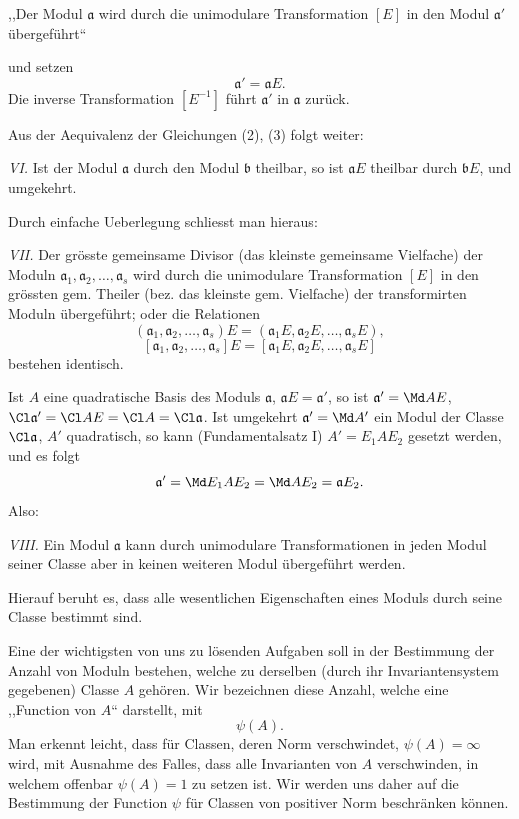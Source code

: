 ,,Der Modul $\mathfrak a$ wird durch die unimodulare Transformation $[E]$ in den Modul $\mathfrak a'$ übergeführt``

und setzen
\[
 \mathfrak a'=\mathfrak a E.
\]
Die inverse Transformation $[E^{-1}]$ führt $\mathfrak a'$ in $\mathfrak a$ zurück.

Aus der Aequivalenz der Gleichungen (2), (3) folgt weiter:

\emph{VI.} Ist der Modul $\mathfrak a$ durch den Modul $\mathfrak b$ theilbar, so ist $\mathfrak a E$ theilbar durch $\mathfrak bE$, und umgekehrt.

Durch einfache Ueberlegung schliesst man hieraus:

\emph{VII.} Der grösste gemeinsame Divisor (das kleinste gemeinsame Vielfache) der Moduln $\mathfrak a_1,\mathfrak a_2,\ldots,\mathfrak a_s$ wird durch die unimodulare Transformation $[E]$ in den grössten gem. Theiler (bez. das kleinste gem. Vielfache) der transformirten Moduln übergeführt; oder die Relationen
\[
 (\mathfrak a_1,\mathfrak a_2,\ldots,\mathfrak a_s)E
 =(\mathfrak a_1E,\mathfrak a_2E,\ldots,\mathfrak a_sE),
\]
\[
 [\mathfrak a_1,\mathfrak a_2,\ldots,\mathfrak a_s]E
 =[\mathfrak a_1E,\mathfrak a_2E,\ldots,\mathfrak a_sE]
\]
bestehen identisch.

Ist $A$ eine quadratische Basis des Moduls $\mathfrak a$, $\mathfrak aE=\mathfrak a'$, so ist $\mathfrak a'=\Md AE$, $\Cl\mathfrak a'=\Cl AE=\Cl A=\Cl\mathfrak a$. Ist umgekehrt $\mathfrak a'=\Md A'$ ein Modul der Classe $\Cl\mathfrak a$, $A'$ quadratisch, so kann (Fundamentalsatz I) $A'=E_1AE_2$ gesetzt werden, und es folgt
\[
 \mathfrak a'=\Md E_1AE_2=\Md AE_2=\mathfrak a E_2.
\]
Also:

\emph{VIII.} Ein Modul $\mathfrak a$ kann durch unimodulare Transformationen in jeden Modul seiner Classe aber in keinen weiteren Modul übergeführt werden.

Hierauf beruht es, dass alle wesentlichen Eigenschaften eines Moduls durch seine Classe bestimmt sind.

Eine der wichtigsten von uns zu lösenden Aufgaben soll in der Bestimmung der Anzahl von Moduln bestehen, welche zu derselben (durch ihr Invariantensystem gegebenen) Classe $A$ gehören. Wir bezeichnen diese Anzahl, welche eine ,,Function von $A$`` darstellt, mit
\[
 \psi(A).
\]
Man erkennt leicht, dass für Classen, deren Norm verschwindet, $\psi(A)=\infty$ wird, mit Ausnahme des Falles, dass alle Invarianten von $A$ verschwinden, in welchem offenbar $\psi(A)=1$ zu setzen ist. Wir werden uns daher auf die Bestimmung der Function $\psi$ für Classen von positiver Norm beschränken können.

